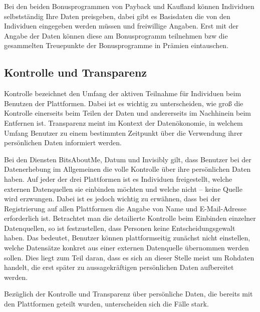 \noindent Bei den beiden Bonusprogrammen von Payback und Kaufland können Individuen selbstständig Ihre Daten preisgeben, dabei gibt es Basisdaten die von den Individuen eingegeben werden müssen und freiwillige Angaben. Erst mit der Angabe der Daten können diese am Bonusprogramm teilnehmen bzw die gesammelten Treuepunkte der Bonusprogramme in Prämien eintauschen.

\subsection{Kontrolle und Transparenz}
Kontrolle bezeichnet den Umfang der aktiven Teilnahme für Individuen beim Benutzen der Plattformen. Dabei ist es wichtig zu unterscheiden, wie groß die Kontrolle einerseits beim Teilen der Daten und andererseits im Nachhinein beim Entfernen ist. Transparenz meint im Kontext der Datenökonomie, in welchem Umfang Benutzer zu einem bestimmten Zeitpunkt über die Verwendung ihrer persönlichen Daten informiert werden. \newline

\noindent Bei den Diensten BitsAboutMe, Datum und Invisibly gilt, dass Benutzer bei der Datenerhebung im Allgemeinen die volle Kontrolle über ihre persönlichen Daten haben. Auf jeder der drei Plattformen ist es Individuen freigestellt, welche externen Datenquellen sie einbinden möchten und welche nicht -- keine Quelle wird erzwungen. Dabei ist es jedoch wichtig zu erwähnen, dass bei der Registrierung auf allen Plattformen die Angabe von Name und E-Mail-Adresse erforderlich ist. Betrachtet man die detailierte Kontrolle beim Einbinden einzelner Datenquellen, so ist festzustellen, dass Personen keine Entscheidungsgewalt haben. Das bedeutet, Benutzer können plattformseitig zunächst nicht einstellen, welche Datensätze konkret aus einer externen Datenquelle übernommen werden sollen. Dies liegt zum Teil daran, dass es sich an dieser Stelle meist um Rohdaten handelt, die erst später zu aussagekräftigen persönlichen Daten aufbereitet werden. \newline

\noindent Bezüglich der Kontrolle und Transparenz über persönliche Daten, die bereits mit den Plattformen geteilt wurden, unterscheiden sich die Fälle stark. \newline

